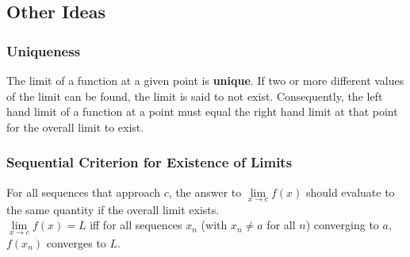 \documentclass[14]{article}
\theoremstyle{definition}
\theoremstyle{case}
\begin{document}
\subsection{Other Ideas}
\subsubsection{Uniqueness}
The limit of a function at a given point is \textbf{unique}. If two or more different values of the limit can be found, the limit is said to not exist. Consequently, the left hand limit of a function at a point must equal the right hand limit at that point for the overall limit to exist.
\subsubsection{Sequential Criterion for Existence of Limits}
For all sequences that approach $c$, the answer to $\lim\limits_{x \rightarrow c} f(x)$ should evaluate to the same quantity if the overall limit exists.\\
$\lim\limits_{x \to c} f(x) = L$ iff for all sequences $x_n$ (with $x_n \neq a$ for all $n$) converging to $a$, $f(x_n)$ converges to $L$.
\pagebreak
\end{document}
